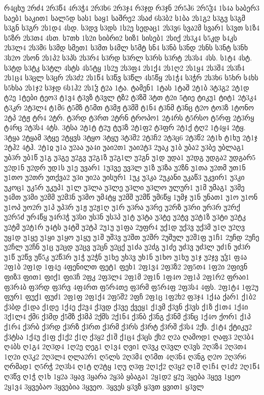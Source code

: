 {რ4ცხუ
2რძ4
2რ3წ4
4რ3ჭ4
2რ3ხ6
2რ3ჯ4
რ3ჯდ
რ3ჯნ
2რ5ჰ6
2რ5ჴ4
1ს4ა
საბერ3
საებ1
საკით1
სალ5დ
სას1
საყ1
საშრე2
3საძ
6ს3ბ2
ს1ბა
2ს1გ2
ს3გვ
ს3გმ
ს3გნ
ს3გრ
2ს1დ4
4სდ.
ს3დვ
ს3დს
1ს2ე
სედაც1
2ს3ვ6
სვა2მ
სვარ1
ს3ვთ
ს1ზ4
ს5ზრ
2ს3თ4
4სთ.
ს7თხ
1ს2ი
სიბრი2
სიზ1
სისებ1
2სიქ
2ს3კ4
ს5კდ
ს4კს
2ს3ლ4
2ს3მ6
ს3მდ
სმეთ1
ს3მთ
ს4მლ
ს5მტ
სნ4
ს3ნბ
ს3ნდ
2სნს
ს3ნტ
ს3ნხ
3ს2ო
2სონ
2ს1პ2
ს3პს
2ს3რ4
ს3რდ
ს3რლ
ს3რს
ს3რტ
2ს3ს4
4სს.
ს1ტ4
4სტ.
ს3ტდ
ს3ტკ
ს3ტლ
4სტს
4ს5ტყ
1ს2უ
2ს3ფ4
2ს1ქ4
2ს1ღ2
2ს1ყ4
2ს3შ4
2ს3ჩ4
2ს1ც4
ს3ცლ
ს3ცრ
2ს3ძ2
2ს1წ4
ს3წვ
ს3წლ
4ს5წყ
2ს1ჭ4
ს3ჭრ
2ს3ხ6
ს5ხრ
ს4ხს
ს5ხსა
2ს1ჯ2
ს3ჯდ
6ს1ჰ2
2ს1ჴ
ტ2ა
1ტა.
ტამენ1
1ტას
1ტაშ
2ტ1ბ
3ტ3გ2
2ტ1დ
ტ2ე
1ტები
ტეო3
ტ1ვ4
ტ3ვზ
ტ3ვლ
ტზ2
ტ3ზშ
3ტთ
ტ2ი
5ტიე
ტიკუ1
ტიტ1
2ტ3კ4
ტ3კრ
2ტ3ლ4
ტ1მ6
ტ5მზ
ტ5მთ
ტ3მჟ
ტ3მშ
ტ1ნ4
ტ3ნმ
ტ3ნც
ტ2ო
ტო3ზ
1ტონო
2ტპ
2ტჟ
ტრ4
2ტრ.
ტ3რდ
ტ3რთ
2ტრნ
ტროპო1
2ტ4რს
ტ5რსო
ტ5რფ
2ტ3რყ
ტ4რც
2ტ3ს4
4ტს.
3ტსა
2ტ1ტ
ტ2უ
ტუ3ზ
2ტ1ფ2
ტ3ფრ
2ტ1ქ
ტღ2
1ტ4ყ4
2ტყ.
3ტყა
2ტყამ
3ტყე
2ტყვს
3ტყო
3ტყუ
3ტ3შ2
2ტ3ჩ2
2ტ3ც6
2ტ3წ2
2ტ1ხ
ტ1ხუ
2ტ1ჯ
2ტჰ2
4ტჰ.
2ტ1ჲ
უ1ა
უ2აა
უა4ი
უაი2თ1
უაი2ტ3
2უაკ
უ1ბ
უბა2
უ3ბე
უბლაგ1
უბ3რ
უბ1წ
უ1გ
უ3გე
უ2გვ
უ2გ1ზ
უ2გ1ლ
უ2გნ
უ1დ
უდა1
უ2დგ
უდგა2
უდგარ5
უ2დ1ნ
უ2დრ
უდ1ს
უ1ე
უვარ1
1უ3ვე
უვ3ლ
უ1ზ
უ3ზა
უ2ზნ
უ1თა
უ2თმ
უთ1ნ
უ1თო
უ2თრ
უთქვა2
უ3ი
უი2ა
უისურ1
1უკ
უ3კა
2უკანი
უკაწ3
უკვირ1
უ3კი
უკოც1
უკ5რ
უკუპ1
უ1ლ
უ3ლა
უ3ლე
უ3ლი
უ3ლო
ულურ1
უ1მ
უმაგ1
უ3მე
უ4მთ
უ3მი
უ2მმ
უ2მ3ნ
უ3მო
უმ4ტყ
უ2მშ
უ2მწ
უმ6წყ
1უმჯ
უ1ნ
უნათ1
უ1ო
უ1ონ
უ1ოპ
უო2რ
უ1პ
უპ3რ
უ1ჟ
უ2ჟ1ღ
უ1რ
უ3რა
უ3რე
უ2რზ
უ3რი
ურ3რ
უ2რქ
უ2რ5ძ
ურ4წყ
უ4რ3ჭ
უ3სი
უს3ნ
უს3პ
უ1ტ
უ3ტა
უ3ტე
უ2ტვ
უ2ტ1ზ
უ3ტი
უ2ტკ
უ2ტმ
უ2ტ1რ
უ4ტს
უ4ტშ
უ2ტჰ
2უ1უ
უ1ფა
2უფრ4
უქ1დ
უქ3ვ
უქ3მ
უ1ღ
უ2ღვ
უყ1დ
უ1ყე
უ1ყი
უ1ყო
უ1ყუ
უ1შ
უშ3ვ
უ2შთ
უ2შრ
2უშულ
უ2შ1ფ
უ1ჩ1
2უჩდ
2უჩე
უ2ჩლ
უ2ჩნ
უ1ც
უ2ცდ
უ2ცვ
უ2ცნ
უ2ცქ
უ1ძა
უ2ძგ
უ1ძე
უძ3ვ
უძ3ლ
უძ1ნ
უძ3რ
უ1წ
უ2წვ
უწ5კ
უ2წ3რ
უ1ჭ
უ2ჭნ
უ1ხე
უხ3ვ
უხ1ნ
უ1ხო
უ1ხუ
უ1ჯ
უ2ჯვ
უჴ1
ფ4ა
2ფ1ბ
2ფ1დ
1ფ4ე
4ფენილთ
ფეტ1
ფეხ1
2ფ1ვ4
2ფ3ზ2
2ფ5თ4
1ფ2ი
2ფივნ
ფიზ3
ფით1
ფიქ1
ფი3ჩ
2ფკ
2ფ3ლ4
2ფ1მ
2ფ1ნ
1ფ4ო
2ფ1პ
2ფ1რ2
ფრაი1
ფ3რ4ბ
ფ3რდ
ფ3რვ
4ფ4რთ
ფ5რ4თე
ფ3რმ
ფ5რ4ფ
2ფ3ს4
4ფს.
2ფ1ტ4
1ფ2უ
ფურ1
ფუქ1
ფუძ1
2ფ1ფ
2ფ1ქ4
2ფ5შ2
2ფჩ
2ფ1ც
1ფ2ხ2
ფ3ჯ4
1ქ4ა
ქარ1
ქ1ბ2
ქ3ბდ
ქ1და
ქ1დე
1ქ4ე
ქ2ვ4
ქ3ვდ
ქ3ვე
ქვეყ1
ქ1ვმ
ქ3ვნ
ქ3ვს
ქ1ზ
ქ1თ4
1ქ4ი
3ქ1ლ4
ქმ6
ქ3მდ
ქ5მზ
ქ3მპ
2ქმს
2ქ1ნ4
ქ3ნბ
ქ3ნგ
ქ3ნმ
ქ3ნც
1ქ4ო
ქორ1
ქ1პ
ქ1რ4
ქ3რბ
ქ3რდ
ქ3რზ
ქ3რთ
ქ3რმ
ქ3რს
ქ3რტ
ქ3რშ
ქ3ს4
2ქს.
ქ1ტ4
ქტიკუ2
ქ3ტსა
1ქ4უ
ქ1ფ
ქ1ქ2
ქ1ღ
ქ3ყ2
ქ1შ
ქ1ც4
ქ3ცს
ქხ2
ღ2ა
ღამოდ1
ღაფ3
2ღ3ბ4
ღ4ბს
ღ1გ4
2ღ3დ4
1ღ2ე
ღეგ1
ღ1ვ4
ღვი1
ღ3ვკ
ღ3ვლ
ღ3ვს
2ღ3ზ4
2ღ3თ4
1ღ2ი
ღ3კ2
2ღ3ლ4
ღლა2რ1
ღ5ლს
2ღ3მ4
ღ5მთ
4ღ3ნ4
ღ3ნგ
ღ2ო
2ღ3რ6
ღრმად1
ღ5რჭ
2ღ3ს4
ღ1ტ
ღ2ტყ
1ღუ
ღ3ფ
2ღ1ქ2
ღ3ყ2
ღ1შ
ღ1ჩ4
ღ1ძ2
2ღ1წ4
ღ3წვ
ღ1ჭ
ღ1ხ
1ყ2ა
3ყავ
3ყარა
2ყ3ბ
ყბაგა1
2ყ1დ2
ყ2ე
3ყება
3ყევ
1ყეო
2ყ1ვ4
3ყვებაო
3ყვებია
3ყვეო.
3ყვეს
ყ3ვზ
ყ3ვთ
ყვით1
ყ3ვლ
}
